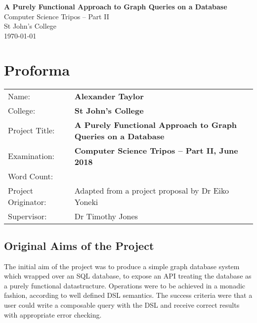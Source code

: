 \documentclass[12pt,a4paper,twoside,openright]{report}
\newcommand{\projectTitle}[0]{A Purely Functional Approach to Graph Queries on a Database}
\begin{document}





\pagestyle{empty}


\vspace*{60mm}
\begin{center}
\Huge
\textbf{\projectTitle} \\[5mm]
Computer Science Tripos -- Part II \\[5mm]
St John's College \\[5mm]
\today  %
\end{center}


\pagestyle{plain}

\chapter*{Proforma}

{\large
\begin{tabular}{ll}
Name:               & \bf Alexander Taylor                       \\
College:            & \bf St John's College                     \\
Project Title:      & \bf \projectTitle  \\
Examination:        & \bf Computer Science Tripos -- Part II, June 2018  \\
Word Count:         & \bf   \\
Project Originator: & Adapted from a project proposal by Dr Eiko Yoneki                    \\
Supervisor:         & Dr Timothy Jones                    \\ 
\end{tabular}
}

\section*{Original Aims of the Project}

The initial aim of the project was to produce a simple graph database system which wrapped over an SQL database, to expose an API treating the database as a purely functional datastructure. Operations were to be achieved in a monadic fashion, according to well defined DSL semantics. The success criteria were that a user could write a composable query with the DSL and receive correct results with appropriate error checking.
\end{document}
